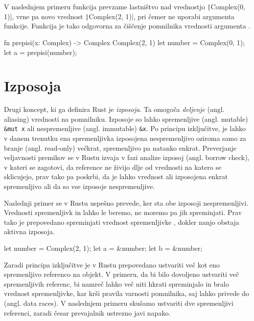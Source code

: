 V naslednjem primeru funkcija  prevzame lastništvo nad vrednostjo \texttt|Complex(0, 1)|, vrne pa novo vrednost \texttt|Complex(2, 1)|, pri čemer ne uporabi argumenta funkcije. Funkcija  je tako odgovorna za čiščenje pomnilnika vrednosti argumenta .

\begin{rust-success}
fn prepisi(x: Complex) -> Complex { Complex(2, 1) }
let number = Complex(0, 1);
let a = prepisi(number);
\end{rust-success}

\section{Izposoja}

Drugi koncept, ki ga definira Rust je \textit{izposoja}. Ta omogoča \textit{deljenje} (angl. aliasing) vrednosti na pomnilniku. Izposoje so lahko spremenljive (angl. mutable) \texttt{\&mut x} ali nespremenljive (angl. immutable) \texttt{\&x}. Po principu izključitve, je lahko v danem trenutku ena spremenljivka izposojena nespremenljivo oziroma samo za branje (angl. read-only) večkrat, spremenljivo pa natanko enkrat. Preverjanje veljavnosti premikov se v Rustu izvaja v fazi analize izposoj (angl. borrow check), v kateri se zagotovi, da reference ne živijo dlje od vrednosti na katero se sklicujejo, prav tako pa poskrbi, da je lahko vrednost ali izposojena enkrat spremenljivo ali da so vse izposoje nespremenljive.

Naslednji primer se v Rustu uspešno prevede, ker sta obe izposoji nespremenljivi. Vrednosti spremenljivk  in  lahko le beremo, ne moremo pa jih spreminjati. Prav tako je prepovedano spreminjati vrednost spremenljivke , dokler nanjo obstaja aktivna izposoja. 

\begin{rust-success}
let number = Complex(2, 1);
let a = &number;
let b = &number;
\end{rust-success}

Zaradi principa izključitve je v Rustu prepovedano ustvariti več kot eno spremenljivo referenco na objekt. V primeru, da bi bilo dovoljeno ustvariti več spremenljivih referenc, bi namreč lahko več niti hkrati spreminjalo in bralo vrednost spremenljivke, kar krši pravila varnosti pomnilnika, saj lahko privede do  (angl. data races). V naslednjem primeru skušamo ustvariti dve spremenljivi referenci, zaradi česar prevajalnik ustrezno javi napako.

